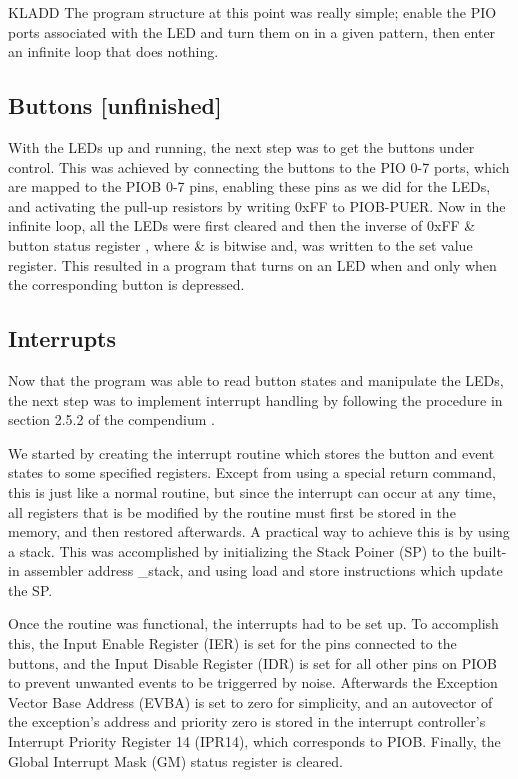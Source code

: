 KLADD
The program structure at this point was really simple; enable the PIO ports associated with the LED and turn them on in a given pattern, then enter an infinite loop that does nothing.
\subsection{Buttons [unfinished]}

With the LEDs up and running, the next step was to get the buttons under control. This was achieved by connecting the buttons to the PIO 0-7 ports, which are mapped to the PIOB 0-7 pins, enabling these pins as we did for the LEDs, and activating the pull-up resistors by writing 0xFF to PIOB-PUER. Now in the infinite loop, all the LEDs were first cleared and then the inverse of 0xFF & {button status register} , where & is bitwise and, was written to the {set value register}. This resulted in a program that turns on an LED when and only when the corresponding button is depressed.
\subsection{Interrupts}

Now that the program was able to read button states and manipulate the LEDs, the next step was to implement interrupt handling by following the procedure in section 2.5.2 of the compendium \cite{kompendium}.

We started by creating the interrupt routine which stores the button and event states to some specified registers. Except from using a special return command, this is just like a normal routine, but since the interrupt can occur at any time, all registers that is be modified by the routine must first be stored in the memory, and then restored afterwards. A practical way to achieve this is by using a stack. This was accomplished by initializing the Stack Poiner (SP) to the built-in assembler address _stack, and using load and store instructions which update the SP.

Once the routine was functional, the interrupts had to be set up. To accomplish this, the Input Enable Register (IER) is set for the pins connected to the buttons, and the Input Disable Register (IDR) is set for all other pins on PIOB to prevent unwanted events to be triggerred by noise. Afterwards the Exception Vector Base Address (EVBA) is set to zero for simplicity, and an autovector of the exception’s address and priority zero is stored in the interrupt controller’s Interrupt Priority Register 14 (IPR14), which corresponds to PIOB. Finally, the Global Interrupt Mask (GM) status register is cleared.

